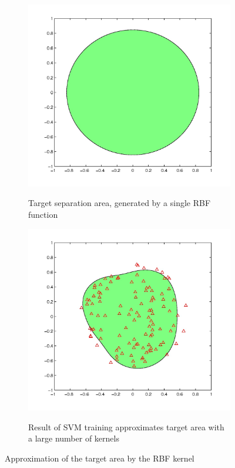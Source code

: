 \begin{figure}[t]
    \centering
\begin{subfigure}[b]{.45\linewidth}
       \includegraphics[width=0.9\linewidth]{Target}
\label{apTarget}
        \caption{Target separation area, generated by a single RBF function}
      \end{subfigure}%
\hspace{.01\linewidth}
\begin{subfigure}[b]{.45\linewidth}
	 \includegraphics[width=0.9\linewidth]{resultApp}
       \label{apResult}
      \caption{Result of SVM training approximates target area with a large number of kernels}
  
	 \end{subfigure}%

    \caption{Approximation of the target area by the RBF kernel}
    \label{approx}
\end{figure}
